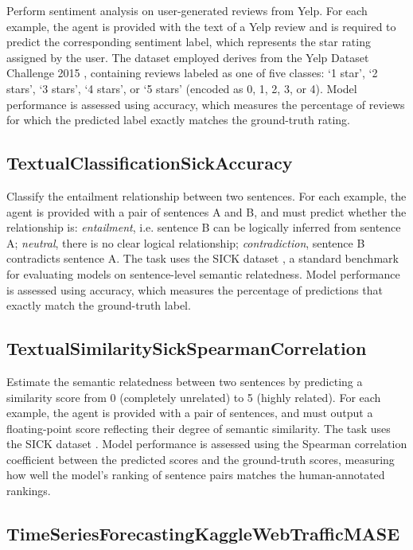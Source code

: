 \documentclass{fairmeta}
\begin{document}
Perform sentiment analysis on user-generated reviews from Yelp. For each example, the agent is provided with the text of a Yelp review and is required to predict the corresponding sentiment label, which represents the star rating assigned by the user. The dataset employed derives from the Yelp Dataset Challenge 2015 \cite{asghar2016yelp}, containing reviews labeled as one of five classes: `1 star', `2 stars', `3 stars', `4 stars', or `5 stars' (encoded as 0, 1, 2, 3, or 4). Model performance is assessed using accuracy, which measures the percentage of reviews for which the predicted label exactly matches the ground-truth rating.

\subsection{TextualClassificationSickAccuracy}

Classify the entailment relationship between two sentences. For each example, the agent is provided with a pair of sentences A and B, and must predict whether the relationship is:
\textit{entailment}, i.e. sentence B can be logically inferred from sentence A; \textit{neutral},  there is no clear logical relationship; \textit{contradiction}, sentence B contradicts sentence A. The task uses the SICK dataset \cite{marelli-etal-2014-sick}, a standard benchmark for evaluating models on sentence-level semantic relatedness. Model performance is assessed using accuracy, which measures the percentage of predictions that exactly match the ground-truth label.

\subsection{TextualSimilaritySickSpearmanCorrelation}

Estimate the semantic relatedness between two sentences by predicting a similarity score from 0 (completely unrelated) to 5 (highly related). For each example, the agent is provided with a pair of sentences, and must output a floating-point score reflecting their degree of semantic similarity. The task uses the SICK dataset \cite{marelli-etal-2014-sick}. Model performance is assessed using the Spearman correlation coefficient between the predicted scores and the ground-truth scores, measuring how well the model's ranking of sentence pairs matches the human-annotated rankings.

\subsection{TimeSeriesForecastingKaggleWebTrafficMASE}
\end{document}
